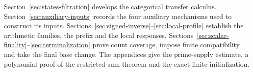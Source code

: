Section~\ref{sec:states-filtration} develops the categorical transfer calculus.  Section~\ref{sec:auxiliary-inputs} records the four auxiliary mechanisms used to construct its inputs.  Sections~\ref{sec:signed-inverse}--\ref{sec:local-profile} establish the arithmetic families, the prefix and the local responses.  Sections~\ref{sec:scalar-finality}--\ref{sec:terminalization} prove count coverage, impose finite compatibility and take the final base change.  The appendices give the prime-supply estimate, a polynomial proof of the restricted-sum theorem and the exact finite initialization.
